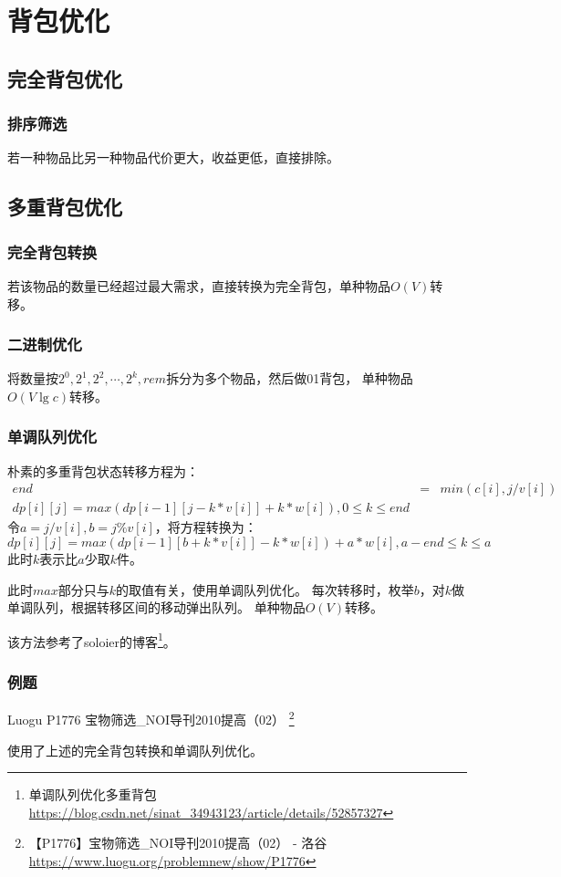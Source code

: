 \section{背包优化}
\subsection{完全背包优化}
\subsubsection{排序筛选}
若一种物品比另一种物品代价更大，收益更低，直接排除。
\subsection{多重背包优化}
\subsubsection{完全背包转换}
若该物品的数量已经超过最大需求，直接转换为完全背包，单种物品$O(V)$转移。
\subsubsection{二进制优化}
将数量按$2^0,2^1,2^2,\cdots,2^k,rem$拆分为多个物品，然后做01背包，
单种物品$O(V\lg c)$转移。
\subsubsection{单调队列优化}
朴素的多重背包状态转移方程为：
\begin{eqnarray*}
    end&=&min(c[i],j/v[i])\\
    dp[i][j]=max(dp[i-1][j-k*v[i]]+k*w[i]),0\leq k \leq end
\end{eqnarray*}
令$a=j/v[i],b=j\%v[i]$，将方程转换为：
\begin{displaymath}
    dp[i][j]=max(dp[i-1][b+k*v[i]]-k*w[i])+a*w[i],a-end\leq k \leq a
\end{displaymath}
此时$k$表示比$a$少取$k$件。

此时$max$部分只与$k$的取值有关，使用单调队列优化。
每次转移时，枚举$b$，对$k$做单调队列，根据转移区间的移动弹出队列。
单种物品$O(V)$转移。

该方法参考了soloier的博客\footnote{单调队列优化多重背包\\
\url{https://blog.csdn.net/sinat\_34943123/article/details/52857327}}。

\subsubsection{例题}
Luogu P1776 宝物筛选\_NOI导刊2010提高（02）
\footnote{【P1776】宝物筛选\_NOI导刊2010提高（02） - 洛谷
\url{https://www.luogu.org/problemnew/show/P1776}}

使用了上述的完全背包转换和单调队列优化。


